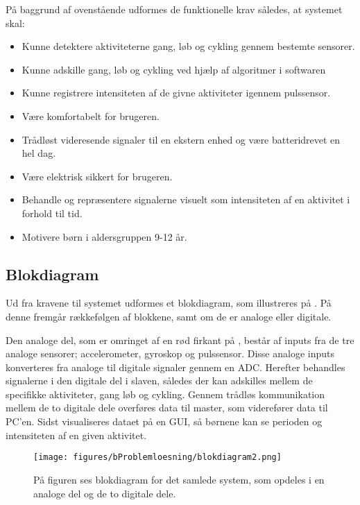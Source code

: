 På baggrund af ovenstående udformes de funktionelle krav således, at systemet skal: 
\begin{itemize}
	\item Kunne detektere aktiviteterne gang, løb og cykling gennem bestemte sensorer.
	\item Kunne adskille gang, løb og cykling ved hjælp af algoritmer i softwaren 
	\item Kunne registrere intensiteten af de givne aktiviteter igennem pulssensor.
	\item Være komfortabelt for brugeren.
	\item Trådløst videresende signaler til en ekstern enhed og være batteridrevet en hel dag.
	\item Være elektrisk sikkert for brugeren.
	\item Behandle og repræsentere signalerne visuelt som intensiteten af en aktivitet i forhold til tid.
	\item Motivere børn i aldersgruppen 9-12 år. 
\end{itemize}

\subsection{Blokdiagram}
Ud fra kravene til systemet udformes et blokdiagram, som illustreres på . På denne fremgår rækkefølgen af blokkene, samt om de er analoge eller digitale. 

Den analoge del, som er omringet af en rød firkant på , består af inputs fra de tre analoge sensorer; accelerometer, gyroskop og pulssensor. Disse analoge inputs konverteres fra analoge til digitale signaler gennem en ADC. Herefter behandles signalerne i den digitale del i slaven, således der kan adskilles mellem de specifikke aktiviteter, gang løb og cykling. Gennem trådløs kommunikation mellem de to digitale dele overføres data til master, som viderefører data til PC'en. Sidst visualiseres dataet på en GUI, så børnene kan se perioden og intensiteten af en given aktivitet.  

 \begin{figure}[H]
 	\centering
 	\texttt{[image: figures/bProblemloesning/blokdiagram2.png]}
 	\caption{På figuren ses blokdiagram for det samlede system, som opdeles i en analoge del og de to digitale dele.}
 	\label{fig:blokdiagram}
 \end{figure}